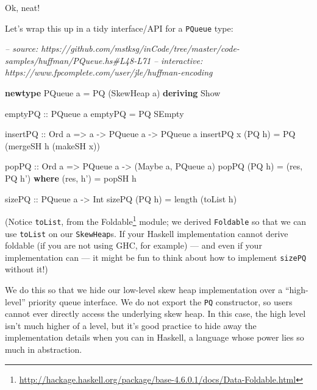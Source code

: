 \documentclass[]{article}
\newenvironment{Shaded}{}{}
\newcommand{\CommentTok}[1]{\textcolor[rgb]{0.38,0.63,0.69}{\textit{#1}}}
\newcommand{\DataTypeTok}[1]{\textcolor[rgb]{0.56,0.13,0.00}{#1}}
\newcommand{\FunctionTok}[1]{\textcolor[rgb]{0.02,0.16,0.49}{#1}}
\newcommand{\KeywordTok}[1]{\textcolor[rgb]{0.00,0.44,0.13}{\textbf{#1}}}
\newcommand{\NormalTok}[1]{#1}
\newcommand{\OtherTok}[1]{\textcolor[rgb]{0.00,0.44,0.13}{#1}}
\renewcommand{\href}[2]{#2\footnote{\url{#1}}}
\begin{document}
Ok, neat!

Let's wrap this up in a tidy interface/API for a \texttt{PQueue} type:

\begin{Shaded}
\begin{Highlighting}[]
\CommentTok{-- source: https://github.com/mstksg/inCode/tree/master/code-samples/huffman/PQueue.hs#L48-L71}
\CommentTok{-- interactive: https://www.fpcomplete.com/user/jle/huffman-encoding}

\KeywordTok{newtype} \DataTypeTok{PQueue}\NormalTok{ a }\FunctionTok{=} \DataTypeTok{PQ}\NormalTok{ (}\DataTypeTok{SkewHeap}\NormalTok{ a) }\KeywordTok{deriving} \DataTypeTok{Show}

\OtherTok{emptyPQ ::} \DataTypeTok{PQueue}\NormalTok{ a}
\NormalTok{emptyPQ }\FunctionTok{=} \DataTypeTok{PQ} \DataTypeTok{SEmpty}

\OtherTok{insertPQ ::} \DataTypeTok{Ord}\NormalTok{ a }\OtherTok{=>}\NormalTok{ a }\OtherTok{->} \DataTypeTok{PQueue}\NormalTok{ a }\OtherTok{->} \DataTypeTok{PQueue}\NormalTok{ a}
\NormalTok{insertPQ x (}\DataTypeTok{PQ}\NormalTok{ h) }\FunctionTok{=} \DataTypeTok{PQ}\NormalTok{ (mergeSH h (makeSH x))}

\OtherTok{popPQ ::} \DataTypeTok{Ord}\NormalTok{ a }\OtherTok{=>} \DataTypeTok{PQueue}\NormalTok{ a }\OtherTok{->}\NormalTok{ (}\DataTypeTok{Maybe}\NormalTok{ a, }\DataTypeTok{PQueue}\NormalTok{ a)}
\NormalTok{popPQ (}\DataTypeTok{PQ}\NormalTok{ h) }\FunctionTok{=}\NormalTok{ (res, }\DataTypeTok{PQ}\NormalTok{ h')}
  \KeywordTok{where}
\NormalTok{    (res, h') }\FunctionTok{=}\NormalTok{ popSH h}

\OtherTok{sizePQ ::} \DataTypeTok{PQueue}\NormalTok{ a }\OtherTok{->} \DataTypeTok{Int}
\NormalTok{sizePQ (}\DataTypeTok{PQ}\NormalTok{ h) }\FunctionTok{=}\NormalTok{ length (toList h)}
\end{Highlighting}
\end{Shaded}

(Notice \texttt{toList}, from the
\href{http://hackage.haskell.org/package/base-4.6.0.1/docs/Data-Foldable.html}{Foldable}
module; we derived \texttt{Foldable} so that we can use \texttt{toList} on our
\texttt{SkewHeap}s. If your Haskell implementation cannot derive foldable (if
you are not using GHC, for example) --- and even if your implementation can ---
it might be fun to think about how to implement \texttt{sizePQ} without it!)

We do this so that we hide our low-level skew heap implementation over a
``high-level'' priority queue interface. We do not export the \texttt{PQ}
constructor, so users cannot ever directly access the underlying skew heap. In
this case, the high level isn't much higher of a level, but it's good practice
to hide away the implementation details when you can in Haskell, a language
whose power lies so much in abstraction.
\end{document}
